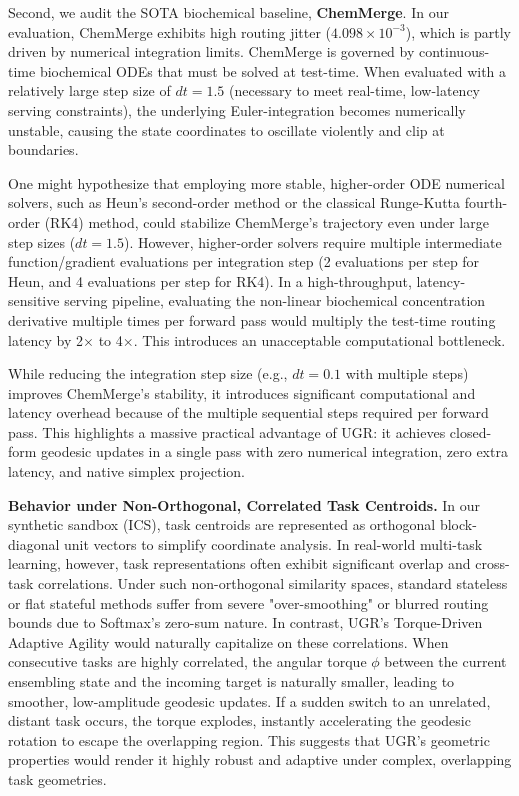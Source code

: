 Second, we audit the SOTA biochemical baseline, \textbf{ChemMerge}. In our evaluation, ChemMerge exhibits high routing jitter ($4.098 \times 10^{-3}$), which is partly driven by numerical integration limits. ChemMerge is governed by continuous-time biochemical ODEs that must be solved at test-time. When evaluated with a relatively large step size of $dt = 1.5$ (necessary to meet real-time, low-latency serving constraints), the underlying Euler-integration becomes numerically unstable, causing the state coordinates to oscillate violently and clip at boundaries. 

One might hypothesize that employing more stable, higher-order ODE numerical solvers, such as Heun's second-order method or the classical Runge-Kutta fourth-order (RK4) method, could stabilize ChemMerge's trajectory even under large step sizes ($dt=1.5$). However, higher-order solvers require multiple intermediate function/gradient evaluations per integration step (2 evaluations per step for Heun, and 4 evaluations per step for RK4). In a high-throughput, latency-sensitive serving pipeline, evaluating the non-linear biochemical concentration derivative multiple times per forward pass would multiply the test-time routing latency by 2$\times$ to 4$\times$. This introduces an unacceptable computational bottleneck.

While reducing the integration step size (e.g., $dt = 0.1$ with multiple steps) improves ChemMerge's stability, it introduces significant computational and latency overhead because of the multiple sequential steps required per forward pass. This highlights a massive practical advantage of UGR: it achieves closed-form geodesic updates in a single pass with zero numerical integration, zero extra latency, and native simplex projection.

\textbf{Behavior under Non-Orthogonal, Correlated Task Centroids.} In our synthetic sandbox (ICS), task centroids are represented as orthogonal block-diagonal unit vectors to simplify coordinate analysis. In real-world multi-task learning, however, task representations often exhibit significant overlap and cross-task correlations. Under such non-orthogonal similarity spaces, standard stateless or flat stateful methods suffer from severe "over-smoothing" or blurred routing bounds due to Softmax's zero-sum nature. In contrast, UGR's Torque-Driven Adaptive Agility would naturally capitalize on these correlations. When consecutive tasks are highly correlated, the angular torque $\phi$ between the current ensembling state and the incoming target is naturally smaller, leading to smoother, low-amplitude geodesic updates. If a sudden switch to an unrelated, distant task occurs, the torque explodes, instantly accelerating the geodesic rotation to escape the overlapping region. This suggests that UGR's geometric properties would render it highly robust and adaptive under complex, overlapping task geometries.

